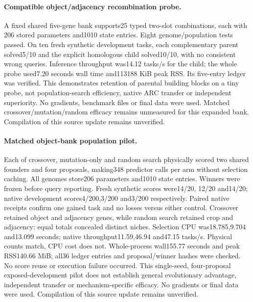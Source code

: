 \documentclass[11pt]{article}
\begin{document}
\paragraph{Compatible object/adjacency recombination probe.}
A fixed shared five-gene bank supports25 typed two-slot combinations, each with
206 stored parameters and1010 state entries. Eight genome/population tests
passed. On ten fresh synthetic development tasks, each complementary parent
solved5/10 and the explicit homologous child solved10/10, with no consistent
wrong queries. Inference throughput was14.12 tasks/s for the child; the whole
probe used7.20 seconds wall time and113188 KiB peak RSS. Its five-entry ledger
was verified. This demonstrates retention of parental building blocks on a tiny
probe, not population-search efficiency, native ARC transfer or independent
superiority. No gradients, benchmark files or final data were used. Matched
crossover/mutation/random efficacy remains unmeasured for this expanded bank.
Compilation of this source update remains unverified.
\paragraph{Matched object-bank population pilot.}
Each of crossover, mutation-only and random search physically scored two
shared founders and four proposals, making348 predictor calls per arm without
selection caching. All genomes store206 parameters and1010 state entries.
Winners were frozen before query reporting. Fresh synthetic scores were14/20,
12/20 and14/20; native development scores4/200,3/200 and3/200 respectively.
Paired native receipts confirm one gained task and no losses versus either
control. Crossover retained object and adjacency genes, while random search
retained crop and adjacency: equal totals concealed distinct niches. Selection
CPU was18.785,9.704 and13.099 seconds; native throughput11.59,46.94 and47.15
tasks/s. Physical counts match, CPU cost does not. Whole-process wall155.77
seconds and peak RSS140.66 MiB; all36 ledger entries and proposal/winner hashes
were checked. No score reuse or execution failure occurred. This single-seed,
four-proposal exposed-development pilot does not establish general evolutionary
advantage, independent transfer or mechanism-specific efficacy. No gradients
or final data were used. Compilation of this source update remains unverified.
\end{document}

